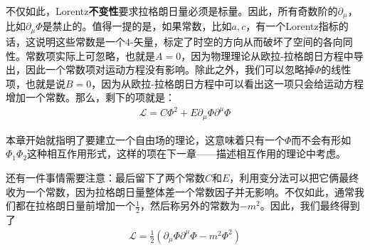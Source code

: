 不仅如此，Lorentz{\bf 不变性}要求拉格朗日量必须是标量。因此，所有奇数阶的$\partial_\mu$，比如$\partial_\mu\Phi$是禁止的。值得一提的是，如果常数，比如$a, c$，有一个Lorentz指标的话，这说明这些常数是一个$4$-矢量，标定了时空的方向从而破坏了空间的各向同性。常数项实际上可忽略，也就是$A=0$，因为物理理论从欧拉-拉格朗日方程中导出，因此一个常数项对运动方程没有影响。除此之外，我们可以忽略掉$\Phi$的线性项，也就是说$B=0$，因为从欧拉-拉格朗日方程中可以看出这一项只会给运动方程增加一个常数。那么，剩下的项就是：
\begin{align}
\label{equ6.3}
\mathscr{L}=C\Phi^2+E\partial_\mu\Phi\partial^\mu\Phi
\end{align}

本章开始就指明了要建立一个自由场的理论，这意味着只有一个$\Phi$而不会有形如$\Phi_1\Phi_2$这种相互作用形式，这样的项在下一章——描述相互作用的理论中考虑。

还有一件事情需要注意：最后留下了两个常数$C$和$E$，利用变分法可以把它俩最终收为一个常数，因为拉格朗日量整体差一个常数因子并无影响。不仅如此，通常我们都在拉格朗日量前增加一个$\frac{1}{2}$，然后称另外的常数为$-m^2$。因此，我们最终得到了
\begin{align}
\label{equ6.4}
\mathscr{L}=\frac{1}{2}(\partial_\mu\Phi\partial^\mu\Phi-m^2\Phi^2)
\end{align}

